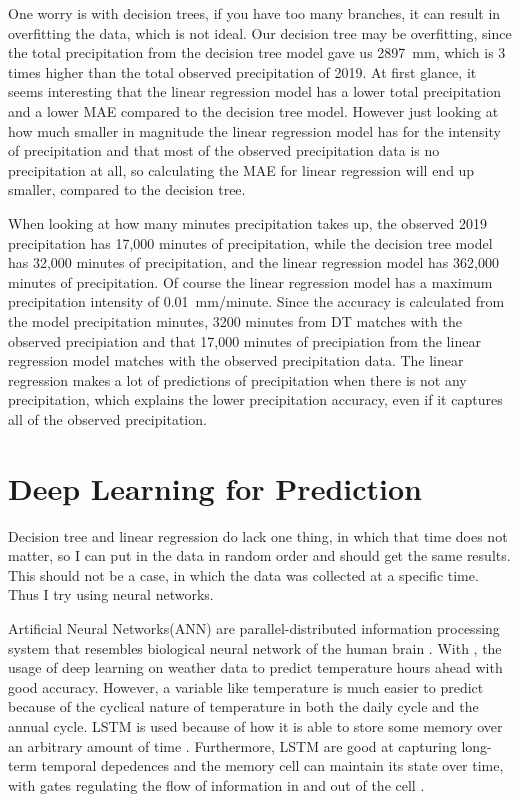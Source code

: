 \documentclass[11pt]{report}
\begin{document}
One worry is with decision trees, if you have too many branches, it can
result in overfitting the data, which is not ideal. Our decision tree may
be overfitting, since the total precipitation from the decision tree model gave us 2897~mm, which is 3 times higher than the total observed precipitation of 2019. At first glance, it seems interesting that the linear regression model has a lower total precipitation and a lower MAE compared to the decision tree model. However just looking at how much smaller in magnitude the linear regression model has for the intensity of precipitation and that most of the observed precipitation data is no precipitation at all, so calculating the MAE for linear regression will end up smaller, compared to the decision tree. 

When looking at how many minutes precipitation takes up, the observed 2019 precipitation has 17,000 minutes of precipitation, while the decision tree model has 32,000 minutes of precipitation, and the linear regression model has 362,000 minutes of precipitation. Of course the linear regression model has a maximum precipitation intensity of 0.01~mm/minute. Since the accuracy is calculated from the model precipitation minutes, 3200 minutes from DT matches with the observed precipiation and that 17,000 minutes of precipiation from the linear regression model matches with the observed precipitation data. The linear regression makes a lot of predictions of precipitation when there is not any precipitation, which explains the lower precipitation accuracy, even if it captures all of the observed precipitation. 

\clearpage

\section{Deep Learning for Prediction}\label{sec:neural}

Decision tree and linear regression do lack one thing, in which that time does not matter, so I can put in the data in random order and should get the same results. This should not be a case, in which the data was collected at a specific time. Thus I try using neural networks.

Artificial Neural Networks(ANN) are parallel-distributed information processing system that resembles biological neural network of the human brain \cite[]{ANN}.
With \cite{Norway}, the usage of deep learning on weather data to 
predict temperature hours ahead with good accuracy. However, a variable like temperature is much easier to predict because of the cyclical nature of temperature in both the daily cycle and the annual cycle. LSTM is used because of how it is able to store some memory over an arbitrary amount of time \cite[]{LSTM}. Furthermore, LSTM are good at capturing long-term temporal depedences and the memory cell can maintain its state over time, with gates regulating the flow of information in and out of the cell \cite[]{LSTM_a}. 
  
\end{document}

